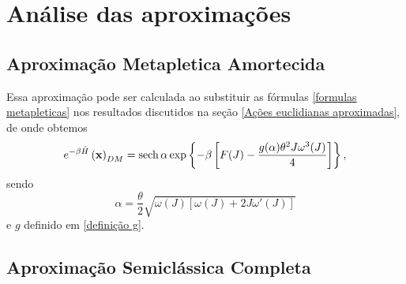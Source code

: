 \documentclass[
	12pt,
	oneside,			%
	a4paper,			%
	english,			%
	brazil				%
	]{abntex2}
\theoremstyle{definition}
\begin{document}
\section{Análise das aproximações}
\subsection{Aproximação Metapletica Amortecida}

Essa aproximação pode ser calculada ao substituir as fórmulas \eqref{formulas metapleticas} nos resultados discutidos na seção \ref{Ações euclidianas aproximadas}, de onde obtemos
\begin{equation}
    e^{-\beta \hat{H}} \left( \mathbf{x}\right)_{DM} = \sech \alpha \exp \left\{ -\beta \left[  F(J) - \frac{g(\alpha) \theta^2 J \omega^3(J)}{4}\right] \right\},
\end{equation}
sendo
\begin{equation}
    \alpha = \frac{\theta}{2} \sqrt{\omega(J)\left[\omega(J) + 2J \omega'(J)\right]}
\end{equation}
e $g$ definido em \eqref{definição g}.

\subsection{Aproximação Semiclássica Completa}
\end{document}
